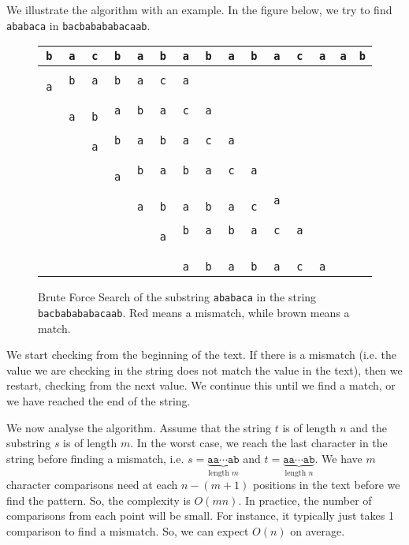 \documentclass[a4paper, openany]{memoir}
\begin{document}
We illustrate the algorithm with an example. In the figure below, we try to find \texttt{ababaca} in \texttt{bacbabababacaab}.
\begin{figure}[H]
    \centering
    \begin{tabular}{ccccccccccccccc}
        \texttt{b} & \texttt{a} & \texttt{c} & \texttt{b} & \texttt{a} & \texttt{b} & \texttt{a} & \texttt{b} & \texttt{a} & \texttt{b} & \texttt{a} &\texttt{c} & \texttt{a} & \texttt{a} & \texttt{b} \\
        \hline
        \texttt{{\color{red} a}} & \texttt{b} & \texttt{a} & \texttt{b} & \texttt{a} & \texttt{c} & \texttt{a} \\
        & \texttt{{\color{brown} a}} & \texttt{{\color{red} b}} & \texttt{a} & \texttt{b} & \texttt{a} & \texttt{c} & \texttt{a} \\
        & & \texttt{{\color{red} a}} & \texttt{b} & \texttt{a} & \texttt{b} & \texttt{a} & \texttt{c} & \texttt{a} \\
        & & & \texttt{{\color{red} a}} & \texttt{b} & \texttt{a} & \texttt{b} & \texttt{a} & \texttt{c} & \texttt{a} \\
        & & & & \texttt{{\color{brown} a}} & \texttt{{\color{brown} b}} & \texttt{{\color{brown} a}} & \texttt{{\color{brown} b}} & \texttt{{\color{brown} a}} & \texttt{{\color{red} c}} & \texttt{a} \\
        & & & & & \texttt{{\color{red} a}} & \texttt{b} & \texttt{a} & \texttt{b} & \texttt{a} & \texttt{c} & \texttt{a} \\
        & & & & & & \texttt{{\color{brown} a}} & \texttt{{\color{brown} b}} & \texttt{{\color{brown} a}} & \texttt{{\color{brown} b}} & \texttt{{\color{brown} a}} & \texttt{{\color{brown} c}} & \texttt{{\color{brown} a}}
    \end{tabular}
    \caption{Brute Force Search of the substring \texttt{ababaca} in the string \texttt{bacbabababacaab}. Red means a mismatch, while brown means a match.}
\end{figure}
We start checking from the beginning of the text. If there is a mismatch (i.e. the value we are checking in the string does not match the value in the text), then we restart, checking from the next value. We continue this until we find a match, or we have reached the end of the string.

We now analyse the algorithm. Assume that the string $t$ is of length $n$ and the substring $s$ is of length $m$. In the worst case, we reach the last character in the string before finding a mismatch, i.e. $s = \underbrace{\texttt{aa} \cdots \texttt{ab}}_{\text{length } m}$ and $t = \underbrace{\texttt{aa} \cdots \texttt{ab}}_{\text{length } n}$. We have $m$ character comparisons need at each $n - (m+1)$ positions in the text before we find the pattern. So, the complexity is $O(mn)$. In practice, the number of comparisons from each point will be small. For instance, it typically just takes 1 comparison to find a mismatch. So, we can expect $O(n)$ on average.
\end{document}
